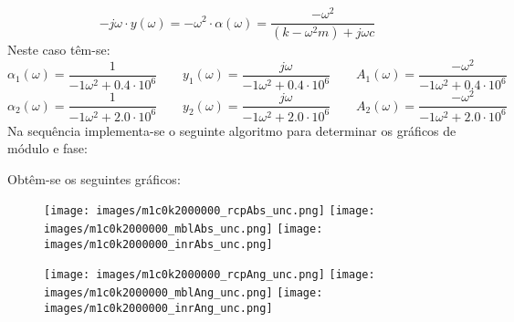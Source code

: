 \documentclass{article}
\begin{document}
\begin{resolution}
\begin{equation}
{            -j\omega   \cdot     y (\omega) = 
            - \omega^2 \cdot \alpha(\omega) = 
            \frac{-\omega^2}{(k -\omega^2 m) + j \omega c}
        }
    \end{equation}
    Neste caso têm-se:
    \begin{equation*}
        \alpha_1(\omega) = \frac{1}{-1\omega^2 + 0.4\cdot 10^6} \qquad
        y_1(\omega) = \frac{j\omega}{-1\omega^2 + 0.4\cdot 10^6} \qquad
        A_1(\omega) = \frac{-\omega^2}{-1\omega^2 + 0.4\cdot 10^6}
    \end{equation*}    \begin{equation*}
        \alpha_2(\omega) = \frac{1}{-1\omega^2 + 2.0\cdot 10^6} \qquad
        y_2(\omega) = \frac{j\omega}{-1\omega^2 + 2.0\cdot 10^6} \qquad
        A_2(\omega) = \frac{-\omega^2}{-1\omega^2 + 2.0\cdot 10^6}
    \end{equation*}
    Na sequência implementa-se o seguinte algoritmo para determinar os gráficos de módulo e fase:
    \begin{scriptsize}
        \myMatlab
    \end{scriptsize}
    Obtêm-se os seguintes gráficos:
    \begin{figure}[H]
        \centering
        \texttt{[image: images/m1c0k2000000\_rcpAbs\_unc.png]}
        \texttt{[image: images/m1c0k2000000\_mblAbs\_unc.png]}
        \texttt{[image: images/m1c0k2000000\_inrAbs\_unc.png]}
    \end{figure}
    \begin{figure}[H]
        \centering
        \texttt{[image: images/m1c0k2000000\_rcpAng\_unc.png]}
        \texttt{[image: images/m1c0k2000000\_mblAng\_unc.png]}
        \texttt{[image: images/m1c0k2000000\_inrAng\_unc.png]}
    \end{figure}
\end{resolution}
\end{document}
